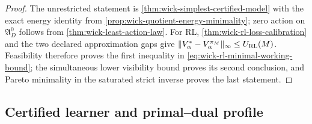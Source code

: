 \documentclass[11pt]{article}
\numberwithin{section}{part}
\theoremstyle{plain}
\theoremstyle{definition}
\theoremstyle{remark}
\begin{document}
\begin{proof}
The unrestricted statement is
\cref{thm:wick-simplest-certified-model} with the exact energy identity from
\cref{prop:wick-quotient-energy-minimality}; zero action on
\(\mathfrak A_D^0\) follows from \cref{thm:wick-least-action-law}.  For RL,
\cref{thm:wick-rl-loss-calibration} and the two declared approximation gaps
give
\(\|V_\alpha^*-V_\alpha^{\pi_M}\|_\infty\le U_{\rm RL}(M)\).
Feasibility therefore proves the first inequality in
\eqref{eq:wick-rl-minimal-working-bound}; the simultaneous lower visibility
bound proves its second conclusion, and Pareto minimality in the saturated
strict inverse proves the last statement.
\end{proof}

\subsection{Certified learner and primal--dual profile}
\label{subsec:wick-certified-learner}
\end{document}
